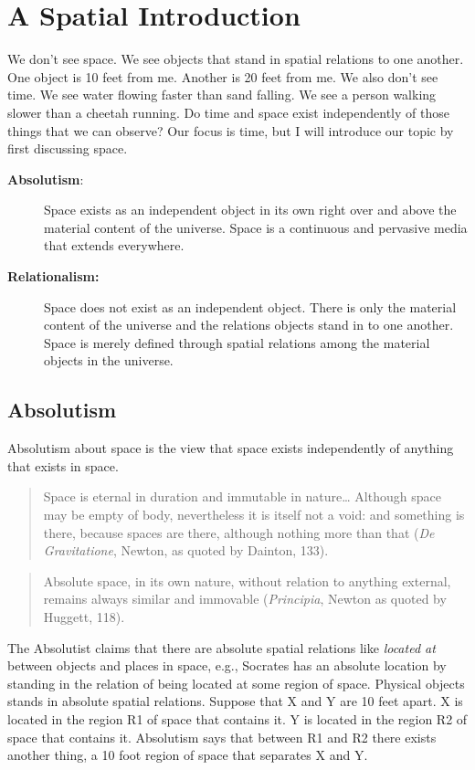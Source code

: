 \documentclass[oneside]{article}
\begin{document}
\thispagestyle{fancy}

\section*{A Spatial Introduction}
We don't see space. We see objects that stand in spatial relations to one another. One object is 10 feet from me. Another is 20 feet from me. We also don't see time. We see water flowing faster than sand falling. We see a person walking slower than a cheetah running. Do time and space exist independently of those things that we can observe? Our focus is time, but I will introduce our topic by first discussing space. 

\begin{description}
\item[\textbf{Absolutism}:]
Space exists as an independent object in its own right over and above
the material content of the universe. Space is a continuous and
pervasive media that extends everywhere.
\item[\textbf{Relationalism:}]
Space does not exist as an independent object. There is only the
material content of the universe and the relations objects stand in to
one another. Space is merely defined through spatial relations among the
material objects in the universe.
\end{description}




\subsection*{Absolutism}
Absolutism about space is the view that space exists independently of anything that exists in space. 
\begin{quote}
Space is eternal in duration and immutable in nature\ldots{} Although
space may be empty of body, nevertheless it is itself not a void: and
something is there, because spaces are there, although nothing more than
that (\emph{De Gravitatione}, Newton, as quoted by Dainton, 133).
\end{quote}

\begin{quote}
Absolute space, in its own nature, without relation to anything
external, remains always similar and immovable (\emph{Principia}, Newton as quoted
by Huggett, 118).
\end{quote}
The Absolutist claims that there are absolute spatial relations like \emph{located at} between objects and places in space, e.g., Socrates has an absolute location by standing in the relation of being located at some region of space. Physical objects stands in absolute spatial relations. Suppose that X and Y are 10 feet apart. X is located in the region R1 of space that contains it. Y is located in the region R2 of space that contains it. Absolutism says that between R1 and R2 there exists another thing, a 10 foot region of space that separates X and Y.
\end{document}
